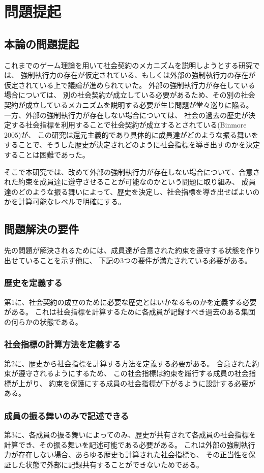 \chapter{問題提起}
\section{本論の問題提起}
これまでのゲーム理論を用いて社会契約のメカニズムを説明しようとする研究では、
強制執行力の存在が仮定されている、もしくは外部の強制執行力の存在が仮定されている上で議論が進められていた。
外部の強制執行力が存在している場合については、
別の社会契約が成立している必要があるため、その別の社会契約が成立しているメカニズムを説明する必要が生じ問題が堂々巡りに陥る。
一方、外部の強制執行力が存在しない場合については、
社会の過去の歴史が決定する社会指標を利用することで社会契約が成立するとされている(Binmore 2005\cite{binmore2005})が、
この研究は還元主義的であり具体的に成員達がどのような振る舞いをすることで、そうした歴史が決定されどのように社会指標を導き出すのかを決定することは困難であった。

そこで本研究では、改めて外部の強制執行力が存在しない場合について、合意された約束を成員達に遵守させることが可能なのかという問題に取り組み、
成員達のどのような振る舞いによって、歴史を決定し、社会指標を導き出せばよいのかを計算可能なレベルで明確にする。


\section{問題解決の要件}
先の問題が解決されるためには、成員達が合意された約束を遵守する状態を作り出せていることを示す他に、
下記の3つの要件が満たされている必要がある。

\subsection{歴史を定義する}
第1に、社会契約の成立のために必要な歴史とはいかなるものかを定義する必要がある。
これは社会指標を計算するために各成員が記録すべき過去のある集団の何らかの状態である。


\subsection{社会指標の計算方法を定義する}
第2に、歴史から社会指標を計算する方法を定義する必要がある。\cite{simon:1947}
合意された約束が遵守されるようにするため、
この社会指標は約束を履行する成員の社会指標が上がり、
約束を保護にする成員の社会指標が下がるように設計する必要がある。


\subsection{成員の振る舞いのみで記述できる}
第3に、各成員の振る舞いによってのみ、歴史が共有されて各成員の社会指標を計算でき、その振る舞いを記述可能である必要がある。
これは外部の強制執行力が存在しない場合、あらゆる歴史も計算された社会指標も、
その正当性を保証した状態で外部に記録共有することができないためである。